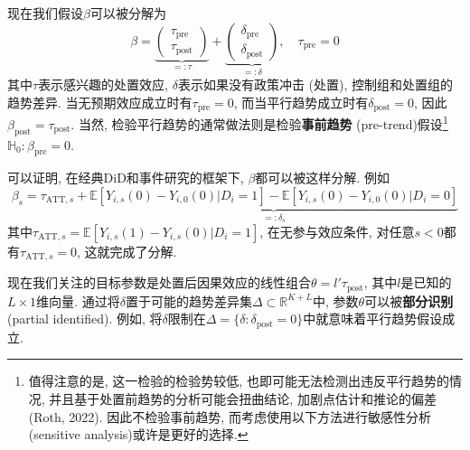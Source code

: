 \documentclass[cn,sakura,14pt,screen,bibstyle=gb7714-2015,math=mtpro2]{elegantnote}
\newcommand{\E}{\mathbb{E}}
\begin{document}
现在我们假设$\beta$可以被分解为
$$\beta=\underbrace{\begin{pmatrix}
          \tau_\text{pre} \\
          \tau_\text{post}
        \end{pmatrix}}_{=:\tau}+\underbrace{\begin{pmatrix}
          \delta_\text{pre} \\
          \delta_\text{post}
        \end{pmatrix}}_{=:\delta},\quad \tau_\text{pre}=0$$
其中$\tau$表示感兴趣的处置效应, $\delta$表示如果没有政策冲击 (处置), 控制组和处置组的趋势差异. 当无预期效应成立时有$\tau_\text{pre}=0$, 而当平行趋势成立时有$\delta_\text{post}=0$, 因此$\beta_\text{post}=\tau_\text{post}$. 当然, 检验平行趋势的通常做法则是检验\textbf{事前趋势} (pre-trend)假设\footnote{值得注意的是, 这一检验的检验势较低, 也即可能无法检测出违反平行趋势的情况, 并且基于处置前趋势的分析可能会扭曲结论, 加剧点估计和推论的偏差 (Roth, 2022). 因此不检验事前趋势, 而考虑使用以下方法进行敏感性分析 (sensitive analysis)或许是更好的选择.}$\mathbb{H} _0:\beta_\text{pre}=0$.

可以证明, 在经典DiD和事件研究的框架下, $\beta$都可以被这样分解. 例如
$$\beta_s=\tau_{\text{ATT},s}+\underbrace{\E[Y_{i,s}(0)-Y_{i,0}(0)|D_i=1]-\E[Y_{i,s}(0)-Y_{i,0}(0)|D_i=0]}_{=:\delta_s}$$
其中$\tau_{\text{ATT},s}=\E[Y_{i,s}(1)-Y_{i,s}(0)|D_i=1]$, 在无参与效应条件, 对任意$s<0$都有$\tau_{\text{ATT},s}=0$, 这就完成了分解.

现在我们关注的目标参数是处置后因果效应的线性组合$\theta=l'\tau_\text{post}$, 其中$l$是已知的$L\times1$维向量. 通过将$\delta$置于可能的趋势差异集$\Delta\subset\mathbb{R}^{K+L}$中, 参数$\theta$可以被\textbf{部分识别} (partial identified). 例如, 将$\delta$限制在$\Delta=\{\delta:\delta_\text{post}=0\}$中就意味着平行趋势假设成立.
\end{document}
